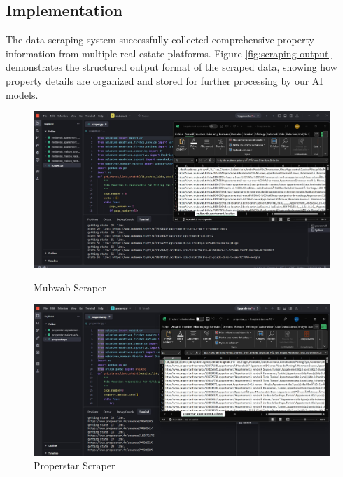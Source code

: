 \subsection{Implementation}
The data scraping system successfully collected comprehensive property information from multiple real estate platforms. Figure \ref{fig:scraping-output} demonstrates the structured output format of the scraped data, showing how property details are organized and stored for further processing by our AI models.
\begin{figure}[htbp]
    \centering
    \begin{minipage}{0.45\textwidth}
        \centering
        \includegraphics[width=\linewidth]{images/mubwab_scraper.jpeg}
        \caption*{Mubwab Scraper}
    \end{minipage}
    \hfill
    \begin{minipage}{0.45\textwidth}
        \centering
        \includegraphics[width=\linewidth]{images/properstar_scraper.jpeg}
        \caption*{Properstar Scraper}
    \end{minipage}
    
    \vspace{1cm}
    

\end{figure}
